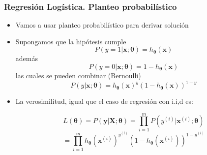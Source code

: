 \documentclass[10pt]{beamer}
\begin{document}
\begin{frame}
\frametitle{Regresión Logística. Planteo probabilístico}
\begin{itemize}
\item Vamos a usar planteo probabilístico para derivar solución 
\item Supongamos que la hipótesis cumple
\begin{equation*}
P(y=1\vert \boldsymbol{x};\boldsymbol{\theta} )= h_{\boldsymbol{\theta}} (\boldsymbol{x})
\end{equation*}
además
\begin{equation*}
P(y=0\vert \boldsymbol{x};\boldsymbol{\theta} )= 1- h_{\boldsymbol{\theta}} (\boldsymbol{x})
\end{equation*}
las cuales se pueden combinar (Bernoulli)
\begin{equation*}
P(y \vert \boldsymbol{x};\boldsymbol{\theta} )= h_{\boldsymbol{\theta}} (\boldsymbol{x})^y(1- h_{\boldsymbol{\theta}} (\boldsymbol{x}))^{1-y}
\end{equation*}
\item La verosimilitud, igual que el caso de regresión con i.i,d es:

\begin{equation*}
L(\boldsymbol{\theta})= P(\boldsymbol{y} \vert \boldsymbol{X};\boldsymbol{\theta} )= \prod_{i=1}^{m} P(y^{(i)}\vert \boldsymbol{x}^{(i)};\boldsymbol{\theta} )  
\end{equation*}
\begin{equation*}
=\prod_{i=1}^{m} h_{\boldsymbol{\theta}} (\boldsymbol{x}^{(i)})^{y^{(i)}}( 1- h_{\boldsymbol{\theta}} (\boldsymbol{x}^{(i)}))^{1-y^{(i)}}
\end{equation*}
\end{itemize}

\end{frame}
\end{document}
